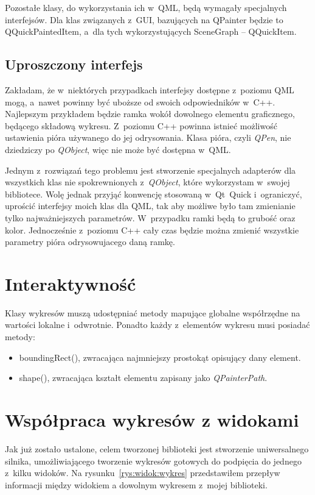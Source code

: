 Pozostałe klasy, do wykorzystania ich w~QML, będą wymagały specjalnych interfejsów. Dla klas związanych z~GUI, bazujących na QPainter będzie to QQuickPaintedItem, a~dla tych wykorzystujących SceneGraph -- QQuickItem.

\subsection{Uproszczony interfejs}
Zakładam, że w~niektórych przypadkach interfejsy dostępne z~poziomu QML mogą, a~nawet powinny być uboższe od swoich odpowiedników w~C++. Najlepszym przykładem będzie ramka wokół dowolnego elementu graficznego, będącego składową wykresu. Z~poziomu C++ powinna istnieć możliwość ustawienia pióra używanego do jej odrysowania. Klasa pióra, czyli \textit{QPen}, nie dziedziczy po \textit{QObject}, więc nie może być dostępna w~QML.

Jednym z~rozwiązań tego problemu jest stworzenie specjalnych adapterów dla wszystkich klas nie spokrewnionych z~\textit{QObject}, które wykorzystam w~swojej bibliotece. Wolę jednak przyjąć konwencję stosowaną w~Qt~Quick i~ograniczyć, uprościć interfejsy moich klas dla QML, tak aby możliwe było tam zmienianie tylko najważniejszych parametrów. W~przypadku ramki będą to grubość oraz kolor. Jednocześnie z~poziomu C++ cały czas będzie można zmienić wszystkie parametry pióra odrysowujacego daną ramkę.

\section{Interaktywność}
Klasy wykresów muszą udostępniać metody mapujące globalne współrzędne na wartości lokalne i~odwrotnie. Ponadto każdy z~elementów wykresu musi posiadać metody:
\begin{itemize}
\item{boundingRect(), zwracająca najmniejszy prostokąt opisujący dany element.}
\item{shape(), zwracająca kształt elementu zapisany jako \textit{QPainterPath}.}
\end{itemize}

\section{Współpraca wykresów z widokami }
Jak już zostało ustalone, celem tworzonej biblioteki jest stworzenie uniwersalnego silnika, umożliwiającego tworzenie wykresów gotowych do podpięcia do jednego z~kilku widoków. Na rysunku~\ref{rys:widok:wykres} przedstawiłem przepływ informacji między widokiem a dowolnym wykresem z~mojej biblioteki.

